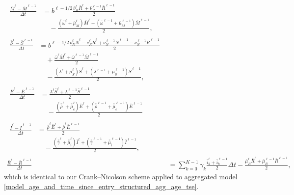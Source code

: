 \documentclass[USenglish]{article}
\begin{document}
\begin{subequations}
  \label{numerics_age_and_time_since_entry_structured_agg_age_tse}
  \begin{align}
    \begin{split}
      \frac{\bar{M}^{\ell} - \bar{M}^{\ell - 1}}{\Delta t}
      &=
      b^{\ell - 1 / 2}
      \frac{\bar{\nu}_R^{\ell} \bar{R}^{\ell}
        + \bar{\nu}_R^{\ell - 1} \bar{R}^{\ell - 1}}{2}
      \\ & \quad {}
      - \frac{(\bar{\omega}^{\ell} + \bar{\mu}_M^{\ell}) \bar{M}^{\ell}
        + (\bar{\omega}^{\ell - 1} + \bar{\mu}_M^{\ell - 1}) \bar{M}^{\ell - 1}}
      {2},
    \end{split}
    \\
    \begin{split}
      \frac{\bar{S}^{\ell} - \bar{S}^{\ell - 1}}{\Delta t}
      &= b^{\ell - 1 / 2}
      \frac{\bar{\nu}_N^{\ell} \bar{N}^{\ell}
        - \bar{\nu}_R^{\ell} \bar{R}^{\ell}
        + \bar{\nu}_N^{\ell - 1} \bar{N}^{\ell - 1}
        - \bar{\nu}_N^{\ell - 1} \bar{R}^{\ell - 1}}{2}
      \\ & \quad {}
      + \frac{\bar{\omega}^{\ell} \bar{M}^{\ell}
        + \bar{\omega}^{\ell - 1} \bar{M}^{\ell - 1}}{2}
      \\ & \quad {}
      - \frac{(\lambda^{\ell} + \bar{\mu}_S^{\ell}) \bar{S}^{\ell}
        + (\lambda^{\ell - 1} + \bar{\mu}_S^{\ell - 1}) \bar{S}^{\ell - 1}}{2},
    \end{split}
    \\
    \begin{split}
      \frac{\bar{E}^{\ell} - \bar{E}^{\ell - 1}}{\Delta t}
      &= \frac{
        \lambda^{\ell} \bar{S}^{\ell}
        + \lambda^{\ell - 1} \bar{S}^{\ell - 1}
      }{2}
      \\ & \quad {}
      - \frac{
        (\bar{\bar{\rho}}^{\ell} + \bar{\bar{\mu}}_e^{\ell})
        \bar{E}^{\ell}
        + (\bar{\bar{\rho}}^{\ell - 1} + \bar{\bar{\mu}}_e^{\ell - 1})
        \bar{E}^{\ell - 1}
      }{2}
    \end{split}
    \\
    \begin{split}
      \frac{\bar{I}^{\ell} - \bar{I}^{\ell - 1}}{\Delta t}
      &= \frac{
        \bar{\bar{\rho}}^{\ell} \bar{E}^{\ell}
        + \bar{\bar{\rho}}^{\ell} \bar{E}^{\ell - 1}
      }{2}
      \\ & \quad {}
      - \frac{
        (\bar{\bar{\gamma}}^{\ell} + \bar{\bar{\mu}}_i^{\ell})
        \bar{I}^{\ell}
        + (\bar{\bar{\gamma}}^{\ell - 1} + \bar{\bar{\mu}}_i^{\ell - 1})
        \bar{I}^{\ell - 1}
      }{2},
    \end{split}
    \\
    \frac{\bar{R}^{\ell} - \bar{R}^{\ell - 1}}{\Delta t}
    &= \sum_{k = 0}^{K - 1} \gamma_k
    \frac{\bar{i}_k^{\ell} + \bar{i}_k^{\ell - 1}}{2} \Delta t
    - \frac{
      \bar{\mu}_R^{\ell} \bar{R}^{\ell}
      + \bar{\mu}_R^{\ell - 1} \bar{R}^{\ell - 1}
    }{2},
  \end{align}
\end{subequations}
which is identical to our Crank--Nicolson scheme applied to aggregated
model \eqref{model_age_and_time_since_entry_structured_agg_age_tse}.
\end{document}
